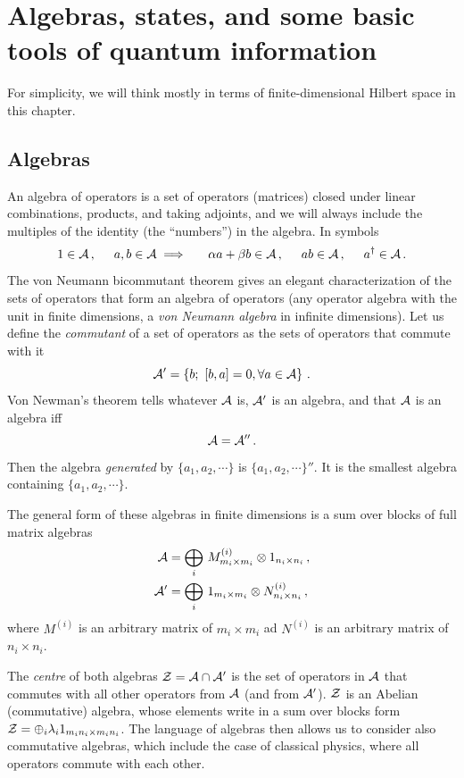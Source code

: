 \documentclass[12pt]{article}
\numberwithin{equation}{section}
\newcommand{\be}{\begin{equation}}
\newcommand{\ee}{\end{equation}}
\begin{document}
\newpage

\section{Algebras, states, and some basic tools of quantum information}
 
For simplicity, we will think mostly in terms of finite-dimensional Hilbert space in this chapter.

\subsection{Algebras}

An algebra of operators is a set of operators (matrices) closed under linear combinations, products, and taking adjoints, and we will always include the multiples of the identity (the ``numbers'') in the algebra. In symbols
\be
1\in {\cal A}\,, \hspace{.5cm} a,b \in {\cal A}\implies  \hspace{.5cm} \alpha a +\beta b \in {\cal A}\,,\hspace{.5cm} a b\in {\cal A}\,,\hspace{.5cm} a^\dagger \in {\cal A}\,.   
\ee
The von Neumann bicommutant theorem gives an elegant characterization of the sets of operators that form an algebra of operators (any operator algebra with the unit in finite dimensions, a {\sl von Neumann algebra} in infinite dimensions). Let us define the {\sl commutant} of a set of operators as the sets of operators that commute with it
\be
{\cal A}' =\left\{b;\,\, [b,a]=0, \forall a\in {\cal A}   \right\}\,. 
\ee
Von Newman's theorem tells whatever ${\cal A}$ is, ${\cal A}'$ is an algebra, and that ${\cal A}$ is an algebra iff
\be
{\cal A}={\cal A}''\,. 
\ee
Then the algebra {\sl generated} by $\{a_1, a_2, \cdots \}$ is $\{a_1, a_2, \cdots \}''$. It is the smallest algebra containing $\{a_1, a_2, \cdots \}$. 

The general form of these algebras in finite dimensions is a sum over blocks of full matrix algebras   
\begin{align}
{\cal A} &= \bigoplus_i \, M^{(i)}_{m_i\times m_i}\otimes 1_{n_i\times n_i}\,,\\
{\cal A}' &= \bigoplus_i \,1_{m_i\times m_i} \otimes N^{(i)}_{n_i\times n_i} \,,
\end{align}
where $M^{(i)}$ is an arbitrary matrix of $m_i \times m_i$ ad $N^{(i)}$ is an arbitrary matrix of $n_i \times n_i$.

The {\sl centre} of both algebras ${\cal Z}={\cal A}\cap {\cal A}'$ is the set of operators in ${\cal A}$ that commutes with all other operators from ${\cal A}$ (and from ${\cal A}'$). ${\cal Z}$ is an Abelian (commutative) algebra, whose elements write in a sum over blocks form ${\cal Z}=\oplus_i \lambda_i 1_{m_i n_i\times m_i n_i}$. The language of algebras then allows us to consider also commutative algebras, which include the case of classical physics, where all operators commute with each other.
\end{document}
